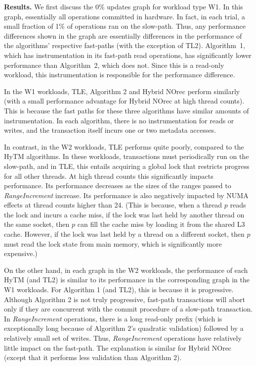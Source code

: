 \vspace{1mm}\noindent\textbf{Results.}
We first discuss the 0\% updates graph for workload type W1.
In this graph, essentially all operations committed in hardware.
In fact, in each trial, a small fraction of 1\% of operations ran on the slow-path.
Thus, any performance differences shown in the graph are essentially differences in the performance of the algorithms' respective fast-paths (with the exception of TL2).
Algorithm~1, which has instrumentation in its fast-path read operations, has significantly lower performance than Algorithm~2, which does not.
Since this is a read-only workload, this instrumentation is responsible for the performance difference.

In the W1 workloads, TLE, Algorithm 2 and Hybrid NOrec perform similarly (with a small performance advantage for Hybrid NOrec at high thread counts).
This is because the fast paths for these three algorithms have similar amounts of instrumentation.
In each algorithm, there is no instrumentation for reads or writes, 
and the transaction itself incurs one or two metadata accesses.

In contrast, in the W2 workloads, TLE performs quite poorly, compared to the HyTM algorithms.
In these workloads, transactions must periodically run on the slow-path, and in TLE, 
this entails acquiring a global lock that restricts progress for all other threads.
At high thread counts this significantly impacts performance.
Its performance decreases as the sizes of the ranges passed to \textit{RangeIncrement} increase.
Its performance is also negatively impacted by NUMA effects at thread counts higher than 24.
(This is because, when a thread $p$ reads the lock and incurs a cache miss, 
if the lock was last held by another thread on the same socket, 
then $p$ can fill the cache miss by loading it from the shared L3 cache.
However, if the lock was last held by a thread on a different socket, 
then $p$ must read the lock state from main memory, which is significantly more expensive.)

On the other hand, in each graph in the W2 workloads, the performance of each HyTM (and TL2) is similar to its performance in the corresponding graph in the W1 workloads.
For Algorithm 1 (and TL2), this is because it is progressive.
Although Algorithm 2 is not truly progressive, fast-path transactions will abort only if they are concurrent with the commit procedure of a slow-path transaction.
In \textit{RangeIncrement} operations, there is a long read-only prefix (which is exceptionally long because of Algorithm 2's quadratic validation) followed by a relatively small set of writes.
Thus, \textit{RangeIncrement} operations have relatively little impact on the fast-path.
The explanation is similar for Hybrid NOrec (except that it performs less validation than Algorithm 2).

